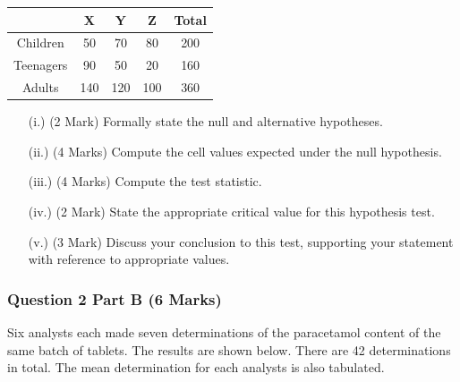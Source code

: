 \documentclass[a4paper,12pt]{article}
\begin{document}
{
	\large
	\begin{center}
		\begin{tabular}{|c|c|c|c|c|}
			\hline
			& X & Y & Z &  Total\\ \hline
			Children  & 50 & 70 & 80 & 200 \\ \hline
			Teenagers  & 90 & 50 & 20 &  160\\ \hline
			Adults  & 140 & 120 & 100 & 360\\ \hline
		\end{tabular} 
	\end{center}
}
\begin{itemize}
	\item[(i.)](2 Mark) Formally state the null and alternative hypotheses.
	\item[(ii.)] (4 Marks) Compute the cell values expected under the null hypothesis. 
	\item[(iii.)](4 Marks) Compute the test statistic.
	\item[(iv.)](2 Mark) State the appropriate critical value for this hypothesis test.
	\item[(v.)](3 Mark) Discuss your conclusion to this test, supporting your statement with reference to appropriate values.
\end{itemize}
\newpage
\subsubsection*{Question 2 Part B (6 Marks)}
Six analysts each made seven determinations of the paracetamol content of the same batch of tablets.
The results are shown below. There are 42 determinations in total. The mean determination for each analysts is also tabulated. \\



\end{document}
